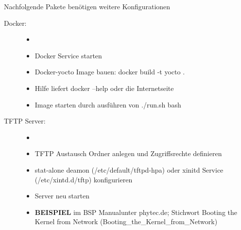 Nachfolgende Pakete benötigen weitere Konfigurationen
\begin{description}
    \item[Docker: ]
        \begin{itemize}
            \item[ ]
            \item Docker Service starten
            \item Docker-yocto Image bauen:
                \glqq docker build -t yocto . \grqq
            \item Hilfe liefert docker --help oder die Internetseite
            \item Image starten durch ausführen von \glqq ./run.sh bash \grqq
        \end{itemize}

    \item[TFTP Server:]
        \begin{itemize}
            \item[ ]
            \item TFTP Austausch Ordner anlegen und Zugriffsrechte definieren
            \item stat-alone deamon (/etc/default/tftpd-hpa) oder xinitd Service
                (/etc/xintd.d/tftp) konfigurieren
            \item Server neu starten
            \item \textbf{BEISPIEL} im \glqq BSP Manual\grqq unter  phytec.de;
                    Stichwort \glqq Booting the Kernel from Network\grqq
                (Booting\_the\_Kernel\_from\_Network)
        \end{itemize}


\end{description}
